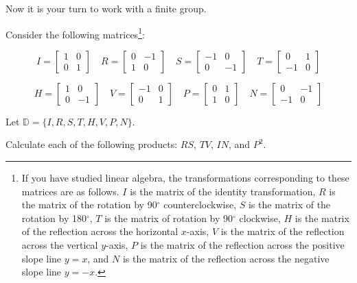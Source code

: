 Now it is your turn to work with a finite group.

\begin{act}
\label{act_finite_gp_matrices}
    Consider the following matrices\footnote{If you have studied linear algebra, the transformations corresponding to these matrices are as follows. $I$ is the matrix of the identity transformation, $R$ is the matrix of the rotation by 90$^\circ$ counterclockwise, $S$ is the matrix of the rotation by 180$^\circ$, $T$ is the matrix of rotation by 90$^\circ$ clockwise, $H$ is the matrix of the reflection across the horizontal $x$-axis, $V$ is the matrix of the reflection across the vertical $y$-axis, $P$ is the matrix of the reflection across the positive slope line $y=x$, and $N$ is the matrix of the reflection across the negative slope line $y=-x$.}:

    $$I = \left[ \begin{array} {cc} 1 & 0 \\ 0 & 1 \end{array} \right] \quad 
    R = \left[ \begin{array} {rr} 0 & -1 \\ 1 & 0 \end{array} \right] \quad  
    S = \left[ \begin{array} {rr} -1 & 0 \\ 0 & -1 \end{array} \right] \quad
    T = \left[ \begin{array} {rr} 0 & 1 \\ -1 & 0 \end{array} \right]$$

    $$H = \left[ \begin{array} {rr} 1 & 0 \\ 0 & -1 \end{array} \right] \quad 
    V = \left[ \begin{array} {rr} -1 & 0 \\ 0 & 1  \end{array} \right] \quad  
    P = \left[ \begin{array} {rr} 0 & 1 \\ 1 & 0  \end{array} \right] \quad
    N = \left[ \begin{array} {rr} 0 & -1 \\ -1 & 0  \end{array} \right]$$

    Let $\mathbb{D} = \{I, R, S, T, H, V, P, N\}$.
        \begin{apart}
            \item \label{part_matrix_missing_table} Calculate each of the following products: $RS$, $TV$, $IN$, and $P^2$.
            

\end{apart}
\end{act}
